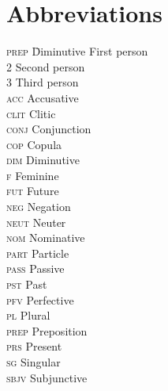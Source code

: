 \documentclass[output=paper]{LSP/langsci}
\begin{document}
\section*{Abbreviations}
\begin{multicols}{3}
\begin{tabbing}
\textsc{prep}\hspace{1em} \= Diminutive             \>  First person\\
2             \>  Second person\\
3             \>  Third person\\
\textsc{acc} \> Accusative\\
\textsc{clit} \> Clitic\\
\textsc{conj} \> Conjunction\\
\textsc{cop} \> Copula\\
\textsc{dim} \> Diminutive\\
\textsc{f} \>     Feminine\\
\textsc{fut} \> Future\\
\textsc{neg} \> Negation\\
\textsc{neut} \> Neuter\\
\textsc{nom} \> Nominative\\
\textsc{part} \> Particle\\
\textsc{pass} \> Passive\\
\textsc{pst} \> Past\\
\textsc{pfv} \> Perfective\\
\textsc{pl} \>     Plural\\
\textsc{prep} \> Preposition\\
\textsc{prs} \> Present\\
\textsc{sg} \>     Singular\\
\textsc{sbjv} \> Subjunctive\\
\end{tabbing}
\end{multicols}
\end{document}
